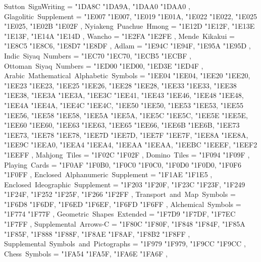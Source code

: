{    Sutton~SignWriting                             = { {"1DA8C} {"1DA9A}, {"1DAA0} {"1DAA0} },
    Glagolitic~Supplement                          = { {"1E007} {"1E007}, {"1E019} {"1E01A}, {"1E022} {"1E022}, {"1E025} {"1E025}, {"1E02B} {"1E02F} },
    Nyiakeng~Puachue~Hmong                         = { {"1E12D} {"1E12F}, {"1E13E} {"1E13F}, {"1E14A} {"1E14D} },
    Wancho                                         = { {"1E2FA} {"1E2FE} },
    Mende~Kikakui                                  = { {"1E8C5} {"1E8C6}, {"1E8D7} {"1E8DF} },
    Adlam                                          = { {"1E94C} {"1E94F}, {"1E95A} {"1E95D} },
    Indic~Siyaq~Numbers                            = { {"1EC70} {"1EC70}, {"1ECB5} {"1ECBF} },
    Ottoman~Siyaq~Numbers                          = { {"1ED00} {"1ED00}, {"1ED3E} {"1ED4F} },
    Arabic~Mathematical~Alphabetic~Symbols         = { {"1EE04} {"1EE04}, {"1EE20} {"1EE20}, {"1EE23} {"1EE23}, {"1EE25} {"1EE26}, {"1EE28} {"1EE28}, {"1EE33} {"1EE33}, {"1EE38} {"1EE38}, {"1EE3A} {"1EE3A}, {"1EE3C} {"1EE41}, {"1EE43} {"1EE46}, {"1EE48} {"1EE48}, {"1EE4A} {"1EE4A}, {"1EE4C} {"1EE4C}, {"1EE50} {"1EE50}, {"1EE53} {"1EE53}, {"1EE55} {"1EE56}, {"1EE58} {"1EE58}, {"1EE5A} {"1EE5A}, {"1EE5C} {"1EE5C}, {"1EE5E} {"1EE5E}, {"1EE60} {"1EE60}, {"1EE63} {"1EE63}, {"1EE65} {"1EE66}, {"1EE6B} {"1EE6B}, {"1EE73} {"1EE73}, {"1EE78} {"1EE78}, {"1EE7D} {"1EE7D}, {"1EE7F} {"1EE7F}, {"1EE8A} {"1EE8A}, {"1EE9C} {"1EEA0}, {"1EEA4} {"1EEA4}, {"1EEAA} {"1EEAA}, {"1EEBC} {"1EEEF}, {"1EEF2} {"1EEFF} },
    Mahjong~Tiles                                  = { {"1F02C} {"1F02F} },
    Domino~Tiles                                   = { {"1F094} {"1F09F} },
    Playing~Cards                                  = { {"1F0AF} {"1F0B0}, {"1F0C0} {"1F0C0}, {"1F0D0} {"1F0D0}, {"1F0F6} {"1F0FF} },
    Enclosed~Alphanumeric~Supplement               = { {"1F1AE} {"1F1E5} },
    Enclosed~Ideographic~Supplement                = { {"1F203} {"1F20F}, {"1F23C} {"1F23F}, {"1F249} {"1F24F}, {"1F252} {"1F25F}, {"1F266} {"1F2FF} },
    Transport~and~Map~Symbols                      = { {"1F6D8} {"1F6DF}, {"1F6ED} {"1F6EF}, {"1F6FD} {"1F6FF} },
    Alchemical~Symbols                             = { {"1F774} {"1F77F} },
    Geometric~Shapes~Extended                      = { {"1F7D9} {"1F7DF}, {"1F7EC} {"1F7FF} },
    Supplemental~Arrows-C                          = { {"1F80C} {"1F80F}, {"1F848} {"1F84F}, {"1F85A} {"1F85F}, {"1F888} {"1F88F}, {"1F8AE} {"1F8AF}, {"1F8B2} {"1F8FF} },
    Supplemental~Symbols~and~Pictographs           = { {"1F979} {"1F979}, {"1F9CC} {"1F9CC} },
    Chess~Symbols                                  = { {"1FA54} {"1FA5F}, {"1FA6E} {"1FA6F} },
}
